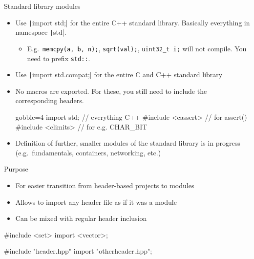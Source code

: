 \begin{frame}[fragile]
  \begin{block}{Standard library modules}
    \begin{itemize}
      \item Use \texttt|import std;| for the entire C++ standard library. Basically everything in namespace \texttt|std|.
      \begin{itemize}
        \item E.g.\ \texttt{memcpy(a, b, n);}, \texttt{sqrt(val);}, \texttt{uint32_t i;} will not compile. You need to prefix \texttt{std::}.
      \end{itemize}
      \item Use \texttt|import std.compat;| for the entire C and C++ standard library
      \item No macros are exported. For these, you still need to include the corresponding headers.
      \begin{cppcode*}{gobble=4}
        import std;        // everything C++
        #include <cassert> // for assert()
        #include <climits> // for e.g. CHAR_BIT
      \end{cppcode*}
      \item Definition of further, smaller modules of the standard library is in progress (e.g.\ fundamentals, containers, networking, etc.)
    \end{itemize}
  \end{block}
\end{frame}

\begin{frame}[fragile]
    \begin{block}{Purpose}
      \begin{itemize}
      \item For easier transition from header-based projects to modules
      \item Allows to import any header file as if it was a module
      \item Can be mixed with regular header inclusion
      \end{itemize}
    \end{block}
    \begin{cppcode}
      #include <set>
      import <vector>;

      #include "header.hpp"
      import "otherheader.hpp";
    \end{cppcode}
\end{frame}

